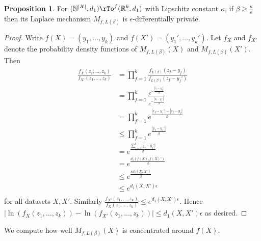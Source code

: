 \documentclass[12pt]{amsart}
\theoremstyle{definition}
\newtheorem{proposition}[theorem]{Proposition}
\begin{document}
\begin{proposition} \label{Laplace_mechanism_privacy} For $(\mathbb{N}^{|\mathcal{X}|}, d_1) \rTo^f (\mathbb{R}^k, d_1)$ with Lipschitz constant $\kappa$, if $\beta \geq \frac{\kappa}{\epsilon}$ then its Laplace mechanism $M_{f, L(\beta)}$ is $\epsilon$-differentially private.
\end{proposition}
\begin{proof} Write $f(X) = (y_1, \dots , y_k)$ and $f(X') = (y_1', \dots , y_k')$. Let $f_X$ and $f_{X'}$ denote the probability density functions of $M_{f, L(\beta)}(X)$ and $M_{f, L(\beta)}(X')$. Then
\begin{align*}
\frac{f_X(z_1, \dots , z_k)}{f_{X'}(z_1, \dots , z_k)} & = \prod\limits_{f = 1}^k \frac{f_{L(\beta)}(z_f - y_f)}{f_{L(\beta)}(z_f - y_f')} \\
 & = \prod\limits_{f = 1}^k \frac{e^{- \frac{|z_f - y_f|}{\beta}}}{e^{- \frac{|z_f - y_f'|}{\beta}}} \\
 & = \prod\limits_{f = 1}^k e^{\frac{|z_f - y_f'| - |z_f - y_f|}{\beta}} \\
 & \leq \prod\limits_{f = 1}^k e^{\frac{|y_f - y_f'|}{\beta}} \\
 & = e^{\frac{\sum\limits_{f = 1}^k |y_f - y_f'|}{\beta}} \\
 & = e^{\frac{d_1(f(X), f(X)')}{\beta}} \\
 & \leq e^{\frac{\kappa d_1(X, X')}{\beta}} \\
 & \leq e^{d_1(X, X') \epsilon} \\
\end{align*}
for all datasets $X, X'$. Similarly $\frac{f_{X'}(z_1, \dots , z_k)}{f_X(z_1, \dots , z_k)} \leq e^{d_1(X, X') \epsilon}$. Hence $|\ln(f_X(z_1, \dots , z_k)) - \ln(f_{X'}(z_1, \dots , z_k))| \leq d_1(X, X') \epsilon$ as desired.
\end{proof}

We compute how well $M_{f, L(\beta)}(X)$ is concentrated around $f(X)$.
\end{document}
